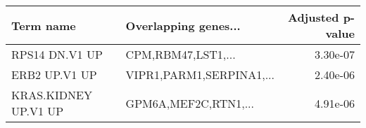 \begin{tabular}{llr}
\toprule
           Term name &     Overlapping genes... &  Adjusted p-value \\
\midrule
      RPS14 DN.V1 UP &       CPM,RBM47,LST1,... &          3.30e-07 \\
       ERB2 UP.V1 UP & VIPR1,PARM1,SERPINA1,... &          2.40e-06 \\
KRAS.KIDNEY UP.V1 UP &     GPM6A,MEF2C,RTN1,... &          4.91e-06 \\
\bottomrule
\end{tabular}
